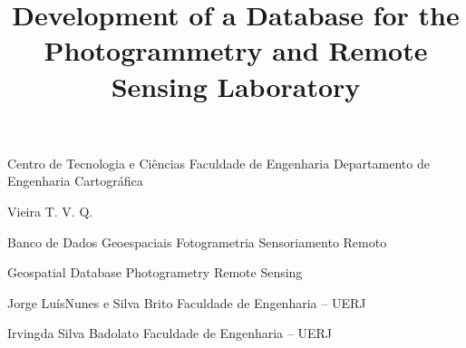 
            {Centro de Tecnologia e Ciências} 
            {Faculdade de Engenharia} 
            {Departamento de Engenharia Cartográfica} 
             

      {Vieira} %
      {T. V. Q.}      %

               {Banco de Dados Geoespaciais}
               {Fotogrametria}
               {Sensoriamento Remoto}
               {} %

\title{Development of a Database for the Photogrammetry and Remote Sensing Laboratory}
         {Geospatial Database}
         {Photogrametry}
         {Remote Sensing}

           {Jorge Luís}{Nunes e Silva Brito} 
           {Faculdade de Engenharia -- UERJ} 

             {Irving}{da Silva Badolato}
             {Faculdade de Engenharia -- UERJ} 


